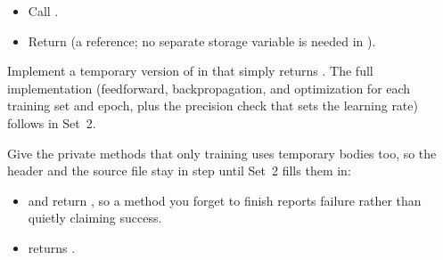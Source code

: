 \begin{itemize}
  \item Call .
  \item Return  (a reference; no separate storage variable is needed
    in ).
\end{itemize}

\label{c4:ex:8}
Implement a temporary version of  in  that
simply returns . The full implementation (feedforward, backpropagation, and optimization
for each training set and epoch, plus the precision check that sets the learning rate) follows in
Set~2.

Give the private methods that only training uses temporary bodies too, so the header and the
source file stay in step until Set~2 fills them in:
\begin{itemize}
  \item {} and  return , so a method you forget to
    finish reports failure rather than quietly claiming success.
  \item {} returns .
\end{itemize}


